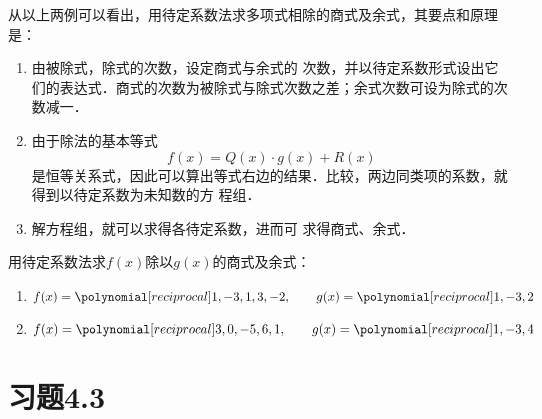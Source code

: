 从以上两例可以看出，用待定系数法求多项式相除的商式及余式，其要点和原理是：
\begin{enumerate}
    \item 由被除式，除式的次数，设定商式与余式的
次数，并以待定系数形式设出它们的表达式．商式的次数为被除式与除式次数之差；余式次数可设为除式的次数减一．
\item 由于除法的基本等式
\[f (x) =Q (x) \cdot g (x) +R (x)\]
是恒等关系式，因此可以算出等式右边的结果．比较，两边同类项的系数，就得到以待定系数为未知数的方
程组．
\item 解方程组，就可以求得各待定系数，进而可
求得商式、余式．
\end{enumerate}

\begin{ex}
    用待定系数法求$f(x)$除以$g(x)$的商式及余式：
    \begin{enumerate}
        \item $f(x)=\poly{1,-3,1,3,-2},\qquad g(x)=\poly{1,-3,2}$
        \item $f(x)=\poly{3,0,-5,6, 1},\qquad g(x)=\poly{1,-3,4}$
    \end{enumerate}
\end{ex}

\section*{习题4.3}

